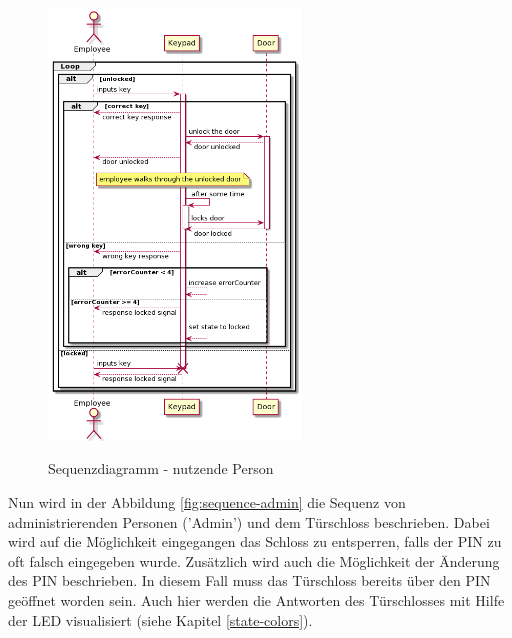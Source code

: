 \begin{figure}[H]
    \caption{Sequenzdiagramm - nutzende Person}
    \centering
    \includegraphics[width=0.6\textwidth]{images/sequence-user.png}
    \label{fig:sequence-user}
\end{figure}

Nun wird in der Abbildung \ref{fig:sequence-admin} die Sequenz von administrierenden Personen ('Admin') und dem Türschloss beschrieben. Dabei wird auf die Möglichkeit eingegangen das Schloss zu entsperren, falls der PIN zu oft falsch eingegeben wurde. Zusätzlich wird auch die Möglichkeit der Änderung des PIN beschrieben. In diesem Fall muss das Türschloss bereits über den PIN geöffnet worden sein. Auch hier werden die Antworten des Türschlosses mit Hilfe der LED visualisiert (siehe Kapitel \ref{state-colors}).

